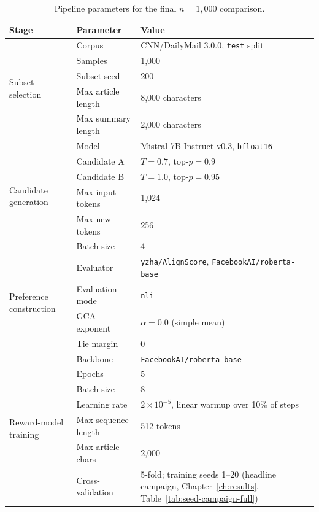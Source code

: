 \begin{table}[htbp]
\centering
\caption[Pipeline parameters for the final $n=1{,}000$ comparison]{Pipeline
parameters for the final $n=1{,}000$ comparison.}
\label{tab:app-params}
\begin{tabularx}{\textwidth}{llX}
\toprule
Stage & Parameter & Value \\
\midrule
\multirow{5}{*}{Subset selection}
  & Corpus              & CNN/DailyMail 3.0.0, \texttt{test} split \\
  & Samples             & 1{,}000 \\
  & Subset seed         & 200 \\
  & Max article length  & 8{,}000 characters \\
  & Max summary length  & 2{,}000 characters \\
\midrule
\multirow{6}{*}{Candidate generation}
  & Model               & Mistral-7B-Instruct-v0.3, \texttt{bfloat16} \\
  & Candidate A         & $T=0.7$, top-$p=0.9$ \\
  & Candidate B         & $T=1.0$, top-$p=0.95$ \\
  & Max input tokens    & 1{,}024 \\
  & Max new tokens      & 256 \\
  & Batch size          & 4 \\
\midrule
\multirow{4}{*}{Preference construction}
  & Evaluator           & \texttt{yzha/AlignScore}, \texttt{FacebookAI/roberta-base} \\
  & Evaluation mode     & \texttt{nli} \\
  & GCA exponent        & $\alpha = 0.0$ (simple mean) \\
  & Tie margin          & $0$ \\
\midrule
\multirow{7}{*}{Reward-model training}
  & Backbone            & \texttt{FacebookAI/roberta-base} \\
  & Epochs              & 5 \\
  & Batch size          & 8 \\
  & Learning rate       & $2\times10^{-5}$, linear warmup over 10\% of steps \\
  & Max sequence length & 512 tokens \\
  & Max article chars   & 2{,}000 \\
  & Cross-validation    & 5-fold; training seeds 1--20 (headline campaign,
    Chapter~\ref{ch:results}, Table~\ref{tab:seed-campaign-full}) \\
\bottomrule
\end{tabularx}
\end{table}

